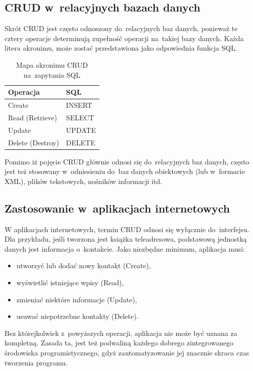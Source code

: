 \documentclass[a4paper,12pt,oneside]{report}
\begin{document}
\subsection{CRUD w~relacyjnych bazach danych}
\label{sub:crud-db}
Skrót CRUD jest często odnoszony do~relacyjnych baz danych, ponieważ te cztery operacje determinują zupełność operacji na~takiej bazy danych. Każda litera akronimu, może zostać przedstawiona jako odpowiednia funkcja SQL.
\begin{table}[h]
  \centering
    \begin{tabular}{|l|l|} \hline
    Operacja         & SQL \\\hline
    Create           & INSERT \\
    Read (Retrieve)  & SELECT \\
    Update           & UPDATE \\
    Delete (Destroy) & DELETE \\\hline
    \end{tabular}
    \caption{Mapa akronimu CRUD na~zapytania SQL\label{crud:sql}}
\end{table}
Pomimo iż pojęcie CRUD głównie odnosi się do~relacyjnych baz danych, często jest też stosowany w~odniesieniu do~baz danych obiektowych (lub w~formacie XML), plików tekstowych, nośników informacji itd.

\subsection{Zastosowanie w~aplikacjach internetowych}
\label{crud:web}
W aplikacjach internetowych, termin CRUD odnosi się wyłącznie do~interfejsu. Dla przykładu, jeśli tworzona jest książka teleadresowa, podstawową jednostką danych jest informacja o~kontakcie. Jako niezbędne minimum, aplikacja musi:

\begin{itemize}
  \item utworzyć lub dodać nowy kontakt (Create),
  \item wyświetlić istniejące wpisy (Read),
  \item zmieniać niektóre informacje (Update),
  \item usuwać niepotrzebne kontakty (Delete).
\end{itemize}

Bez którejkolwiek z~powyższych operacji, aplikacja nie może być uznana za kompletną. Zasada ta, jest też podwaliną każdego dobrego zintegrowanego środowiska programistycznego, gdyż zautomatyzowanie jej znacznie skraca czas tworzenia programu.
\end{document}
